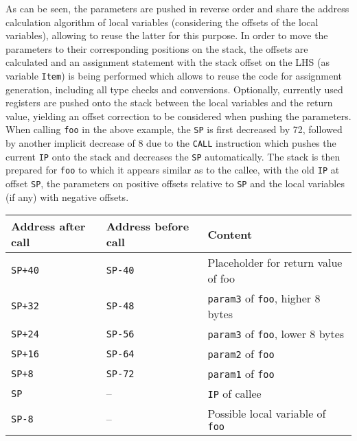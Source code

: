 \documentclass[a4paper]{scrreprt}
\begin{document}
      As can be seen, the parameters are pushed in reverse order and share the address calculation algorithm of local variables (considering the offsets of the local variables), allowing to reuse the latter for this purpose. In order to move the parameters to their corresponding positions on the stack, the offsets are calculated and an assignment statement with the stack offset on the LHS (as variable \texttt{Item}) is being performed which allows to reuse the code for assignment generation, including all type checks and conversions. Optionally, currently used registers are pushed onto the stack between the local variables and the return value, yielding an offset correction to be considered when pushing the parameters.\\
      When calling \texttt{foo} in the above example, the \texttt{SP} is first decreased by 72, followed by another implicit decrease of 8 due to the \texttt{CALL} instruction which pushes the current \texttt{IP} onto the stack and decreases the \texttt{SP} automatically. The stack is then prepared for \texttt{foo} to which it appears similar as to the callee, with the old \texttt{IP} at offset \texttt{SP}, the parameters on positive offsets relative to \texttt{SP} and the local variables (if any) with negative offsets.
      \begin{table}[h!]
      \begin{tabular}{lll}
        \toprule
        \textbf{Address after call} & \textbf{Address before call} & \textbf{Content}\\
        \midrule
        \texttt{SP+40} & \texttt{SP-40} & Placeholder for return value of foo\\
        \texttt{SP+32} & \texttt{SP-48} & \texttt{param3} of \texttt {foo}, higher 8 bytes\\
        \texttt{SP+24} & \texttt{SP-56} & \texttt{param3} of \texttt {foo}, lower 8 bytes\\
        \texttt{SP+16} & \texttt{SP-64} & \texttt{param2} of \texttt {foo}\\
        \texttt{SP+8} & \texttt{SP-72} & \texttt{param1} of \texttt {foo}\\
        \texttt{SP} & -- & \texttt{IP} of callee\\
        \texttt{SP-8} & -- & Possible local variable of \texttt{foo}\\
        \bottomrule
      \end{tabular}
      \end{table}\\ \\
\end{document}
